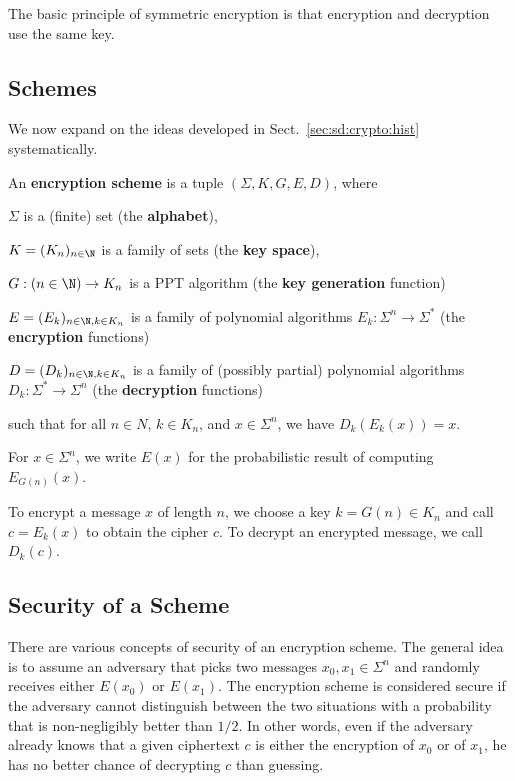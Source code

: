 The basic principle of symmetric encryption is that encryption and decryption use the same key.

\subsection{Schemes}

We now expand on the ideas developed in Sect.~\ref{sec:sd:crypto:hist} systematically.

\begin{definition}\label{def:sd:symscheme}
 An \textbf{encryption scheme} is a tuple $(\Sigma,K,G, E, D)$, where
  \begin{compactitem}
   \item $\Sigma$ is a (finite) set (the \textbf{alphabet}),
   \item $K=(K_n)_{n\in \N}$ is a family of sets (the \textbf{key space}),
   \item $G:(n\in \N)\to K_n$ is a PPT algorithm (the \textbf{key generation} function)
   \item $E=(E_k)_{n\in\N,k\in K_n}$ is a family of polynomial algorithms $E_k:\Sigma^n\to\Sigma^*$ (the \textbf{encryption} functions)
   \item $D=(D_k)_{n\in\N,k\in K_n}$ is a family of (possibly partial) polynomial algorithms $D_k:\Sigma^*\to\Sigma^n$ (the \textbf{decryption} functions)
  \end{compactitem}
  such that for all $n\in N$, $k\in K_n$, and $x\in \Sigma^n$, we have $D_k(E_k(x))=x$.

  For $x\in\Sigma^n$, we write $E(x)$ for the probabilistic result of computing $E_{G(n)}(x)$.
\end{definition}

To encrypt a message $x$ of length $n$, we choose a key $k=G(n)\in K_n$ and call $c=E_k(x)$ to obtain the cipher $c$.
To decrypt an encrypted message, we call $D_k(c)$.

\subsection{Security of a Scheme}

There are various concepts of security of an encryption scheme.
The general idea is to assume an adversary that picks two messages $x_0,x_1\in\Sigma^n$ and randomly receives either $E(x_0)$ or $E(x_1)$.
The encryption scheme is considered secure if the adversary cannot distinguish between the two situations with a probability that is non-negligibly better than $1/2$.
In other words, even if the adversary already knows that a given ciphertext $c$ is either the encryption of $x_0$ or of $x_1$, he has no better chance of decrypting $c$ than guessing.

